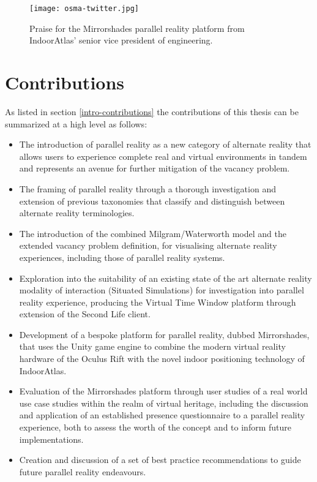 \begin{figure}[t]
	\begin{center}
		\texttt{[image: osma-twitter.jpg]}
		\caption{Praise for the Mirrorshades parallel reality platform from IndoorAtlas' senior vice president of engineering.}
		\label{osma-twitter.jpg}
	\end{center}	
\end{figure}


\section{Contributions}

As listed in section \ref{intro-contributions} the contributions of this thesis can be summarized at a high level as follows:

\begin{itemize}
	\item The introduction of parallel reality as a new category of alternate reality that allows users to experience complete real and virtual environments in tandem and represents an avenue for further mitigation of the vacancy problem.
	\item The framing of parallel reality through a thorough investigation and extension of previous taxonomies that classify and distinguish between alternate reality terminologies.
	\item The introduction of the combined Milgram/Waterworth model and the extended vacancy problem definition, for visualising alternate reality experiences, including those of parallel reality systems.
	\item Exploration into the suitability of an existing state of the art alternate reality modality of interaction (Situated Simulations) for investigation into parallel reality experience, producing the Virtual Time Window platform through extension of the Second Life client.
	\item Development of a bespoke platform for parallel reality, dubbed Mirrorshades, that uses the Unity game engine to combine the modern virtual reality hardware of the Oculus Rift with the novel indoor positioning technology of IndoorAtlas.
	\item Evaluation of the Mirrorshades platform through user studies of a real world use case studies within the realm of virtual heritage, including the discussion and application of an established presence questionnaire to a parallel reality experience, both to assess the worth of the concept and to inform future implementations.
	\item Creation and discussion of a set of best practice recommendations to guide future parallel reality endeavours.
\end{itemize}

